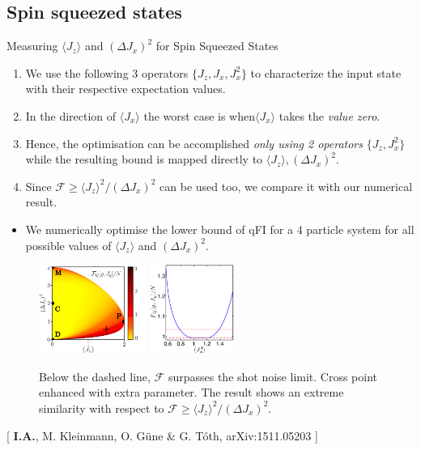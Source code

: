 \documentclass{beamer}
\newcommand{\expect}[1]{\ensuremath{\langle #1 \rangle}}
\newcommand{\varian}[1]{\ensuremath{\left(\Delta #1 \right)^2}}
\newcommand{\citate}[1]{{\footnotesize{\color{gray}[ #1 ]}}

	}
\begin{document}
	\subsection{Spin squeezed states}

		\begin{frame}
			{Measuring $\expect{J_z}$ and $\varian{J_x}$ for Spin Squeezed States}

			\begin{enumerate}
				\item<1-> We use the following 3 operators {\color{blue}$\{ J_z,J_x,J_x^2 \}$} to characterize the input state with their respective expectation values.
				\item<2-> In the direction of $\expect{J_x}$ the worst case is when$\expect{J_x}$ takes the \emph{\color{blue}value zero}.
				\item<3-> Hence, the optimisation can be accomplished \emph{\color{blue} only using 2 operators} $\{ J_z,J_x^2 \}$ while the resulting bound is mapped directly to $\expect{J_z},\varian{J_x}$.
				\item<4-> Since $\mathcal{F}\geq \expect{J_z}^2/\varian{J_x}$ can be used too, we compare it with our numerical result.

			\end{enumerate}

		\end{frame}

		\begin{frame}
			\begin{itemize}
				\item We numerically optimise the lower bound of qFI for a 4 particle system for all possible values of $\expect{J_z}$ and $\varian{J_x}$.
			\end{itemize}
			\begin{figure}
				\includegraphics[height=110px]{img/lb-spsq.pdf}
				\hspace{15px}
				\includegraphics[height=110px]{img/4thparameter-spsq.pdf}
				\caption{Below the dashed line, $\mathcal{F}$ surpasses the shot noise limit. Cross point enhanced with extra parameter. The result shows an extreme similarity with respect to $\mathcal{F}\geq \expect{J_z}^2/\varian{J_x}$.}
			\end{figure}
			\citate{{\bf I.A.}, M. Kleinmann, O. G\"une \& G. T\'oth, arXiv:1511.05203}

		\end{frame}
\end{document}
